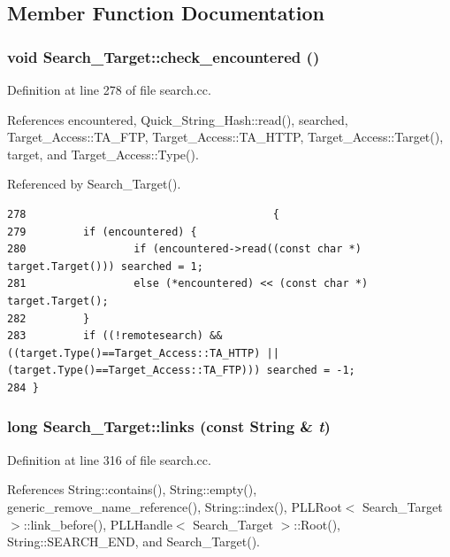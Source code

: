 \subsection{Member Function Documentation}
\subsubsection{\setlength{\rightskip}{0pt plus 5cm}void Search\_\-Target::check\_\-encountered ()\hspace{0.3cm}{\tt  [protected]}}\label{classSearch__Target_b0}




Definition at line 278 of file search.cc.

References encountered, Quick\_\-String\_\-Hash::read(), searched, Target\_\-Access::TA\_\-FTP, Target\_\-Access::TA\_\-HTTP, Target\_\-Access::Target(), target, and Target\_\-Access::Type().

Referenced by Search\_\-Target().



\footnotesize\begin{verbatim}278                                       {
279         if (encountered) {
280                 if (encountered->read((const char *) target.Target())) searched = 1;
281                 else (*encountered) << (const char *) target.Target();
282         }
283         if ((!remotesearch) && ((target.Type()==Target_Access::TA_HTTP) || (target.Type()==Target_Access::TA_FTP))) searched = -1;
284 }
\end{verbatim}\normalsize 
{}
\subsubsection{\setlength{\rightskip}{0pt plus 5cm}long Search\_\-Target::links (const {\bf String} \& {\em t})}\label{classSearch__Target_a4}




Definition at line 316 of file search.cc.

References String::contains(), String::empty(), generic\_\-remove\_\-name\_\-reference(), String::index(), PLLRoot$<$ Search\_\-Target $>$::link\_\-before(), PLLHandle$<$ Search\_\-Target $>$::Root(), String::SEARCH\_\-END, and Search\_\-Target().

